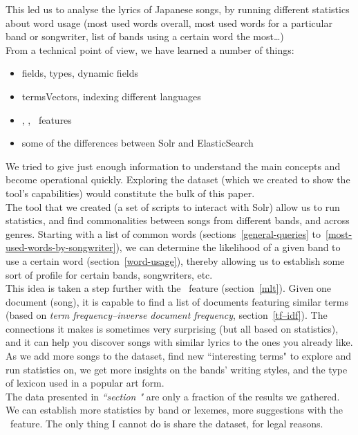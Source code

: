 This led us to analyse the lyrics of Japanese songs, by running different statistics about word usage (most used words overall, most used words for a particular band or songwriter, list of bands using a certain word the most\dots) \\

From a technical point of view, we have learned a number of things:
\begin{itemize}
	\item fields, types, dynamic fields
	\item termsVectors, indexing different languages
	\item \faceting, \aggregations, \MLT\ features
	\item some of the differences between Solr and ElasticSearch %
\end{itemize}

We tried to give just enough information to understand the main concepts and become operational quickly. Exploring the dataset (which we created to show the tool's capabilities) would constitute the bulk of this paper. \\

The tool that we created (a set of scripts to interact with Solr) allow us to run statistics, and find commonalities between songs from different bands, and across genres. 
Starting with a list of common words (sections~\ref{general-queries} to~\ref{most-used-words-by-songwriter}), we can determine the likelihood of a given band to use a certain word (section~\ref{word-usage}), thereby allowing us to establish some sort of profile for certain bands, songwriters, etc. \\

This idea is taken a step further with the \MLT\ feature (section~\ref{mlt}). Given one document (song), it is capable to find a list of documents featuring similar terms (based on \emph{term frequency–inverse document frequency}, section~\ref{tf–idf}). The connections it makes is sometimes very surprising (but all based on statistics), and it can help you discover songs with similar lyrics to the ones you already like. \\

As we add more songs to the dataset, find new ``interesting terms" to explore and run statistics on, we get more insights on the bands' writing styles, and the type of lexicon used in a popular art form. \\

The data presented in \emph{``section "} are only a fraction of the results we gathered. We can establish more statistics by band or lexemes, more suggestions with the \MLT\ feature.
The only thing I cannot do is share the dataset, for legal reasons.
\\

